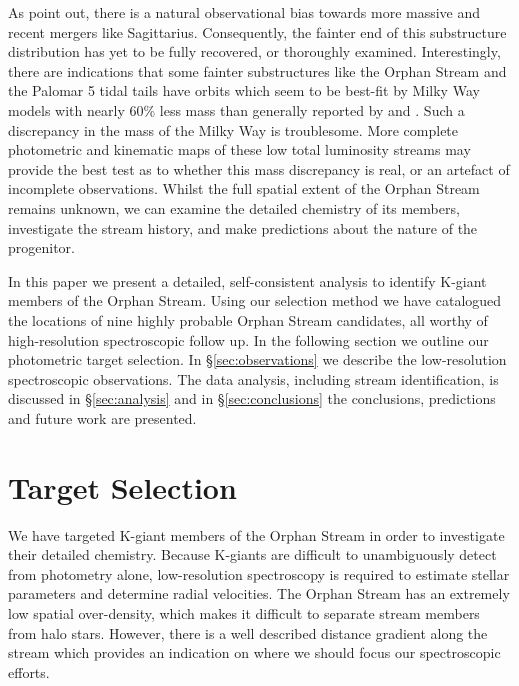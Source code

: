 \documentclass[10pt,apjl]{emulateapj}
\begin{document}
As \citet{Sales_et-al_2008} point out, there is a natural observational bias towards more massive and recent mergers like Sagittarius. Consequently, the fainter end of this substructure distribution has yet to be fully recovered, or thoroughly examined. Interestingly, there are indications that  some fainter substructures like the Orphan Stream and the Palomar 5 tidal tails \citep{Odenkirchen_et-al_2009} have orbits which seem to be best-fit by Milky Way models with nearly 60\% less mass \citep{Newberg_et-al_2010} than generally reported by \citet{Xue_et-al_2008} and \citet{Koposov_et-al_2010}. Such a discrepancy in the mass of the Milky Way is troublesome. More complete photometric and kinematic maps of these low total luminosity streams may provide the best test as to whether this mass discrepancy is real, or an artefact of incomplete observations. Whilst the full spatial extent of the Orphan Stream remains unknown, we can examine the detailed chemistry of its members, investigate the stream history, and make predictions about the nature of the progenitor.

In this paper we present a detailed, self-consistent analysis to identify K-giant members of the Orphan Stream. Using our selection method we have catalogued the locations of nine highly probable Orphan Stream candidates, all worthy of high-resolution spectroscopic follow up. In the following section we outline our photometric target selection. In \S\ref{sec:observations} we describe the low-resolution spectroscopic observations. The data analysis, including stream identification, is discussed in \S\ref{sec:analysis} and in \S\ref{sec:conclusions} the conclusions, predictions and future work are presented.


\section{Target Selection}
\label{sec:target-selection}

We have targeted K-giant members of the Orphan Stream in order to investigate their detailed chemistry. Because K-giants are difficult to unambiguously detect from photometry alone, low-resolution spectroscopy is required to estimate stellar parameters and determine radial velocities. The Orphan Stream has an extremely low spatial over-density, which makes it difficult to separate stream members from halo stars. However, there is a well described distance gradient along the stream \citep{Belokurov_et-al_2007, Newberg_et-al_2010} which provides an indication on where we should focus our spectroscopic efforts.
\end{document}
